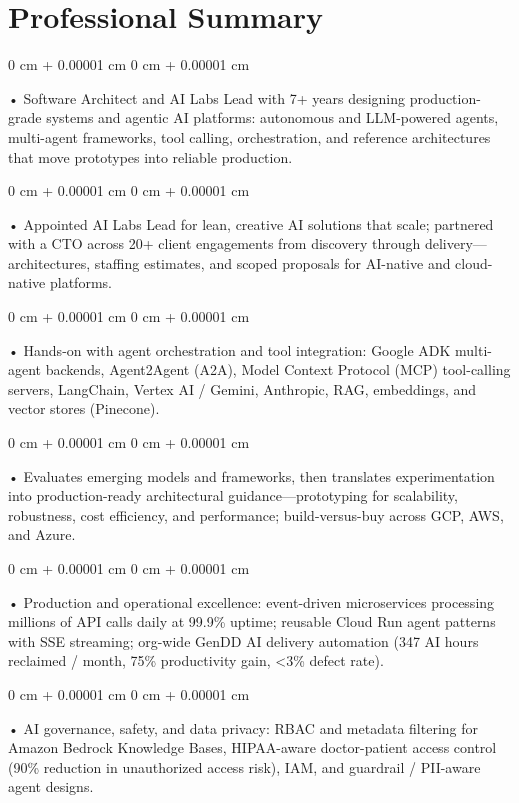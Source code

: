 \documentclass[10pt, letterpaper]{article}
\newenvironment{onecolentry}{
    \begin{adjustwidth}{
        0 cm + 0.00001 cm
    }{
        0 cm + 0.00001 cm
    }
}{
    \end{adjustwidth}
} %
\begin{document}
    \section{Professional Summary}
        \vspace{2 pt }
        \begin{onecolentry}
            • Software Architect and AI Labs Lead with 7+ years designing production-grade systems and agentic AI platforms: autonomous and LLM-powered agents, multi-agent frameworks, tool calling, orchestration, and reference architectures that move prototypes into reliable production.
        \end{onecolentry}
        \begin{onecolentry}
            • Appointed AI Labs Lead for lean, creative AI solutions that scale; partnered with a CTO across 20+ client engagements from discovery through delivery---architectures, staffing estimates, and scoped proposals for AI-native and cloud-native platforms.
        \end{onecolentry}
        \begin{onecolentry}
            • Hands-on with agent orchestration and tool integration: Google ADK multi-agent backends, Agent2Agent (A2A), Model Context Protocol (MCP) tool-calling servers, LangChain, Vertex AI / Gemini, Anthropic, RAG, embeddings, and vector stores (Pinecone).
        \end{onecolentry}
        \begin{onecolentry}
            • Evaluates emerging models and frameworks, then translates experimentation into production-ready architectural guidance---prototyping for scalability, robustness, cost efficiency, and performance; build-versus-buy across GCP, AWS, and Azure.
        \end{onecolentry}
        \begin{onecolentry}
            • Production and operational excellence: event-driven microservices processing millions of API calls daily at 99.9\% uptime; reusable Cloud Run agent patterns with SSE streaming; org-wide GenDD AI delivery automation (347 AI hours reclaimed / month, 75\% productivity gain, {<}3\% defect rate).
        \end{onecolentry}
        \begin{onecolentry}
            • AI governance, safety, and data privacy: RBAC and metadata filtering for Amazon Bedrock Knowledge Bases, HIPAA-aware doctor-patient access control (90\% reduction in unauthorized access risk), IAM, and guardrail / PII-aware agent designs.
        \end{onecolentry}
\end{document}
